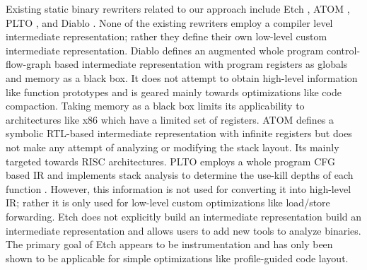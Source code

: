 Existing static binary rewriters related to our approach include Etch \cite{etch}, ATOM \cite{atom}, PLTO
\cite{plto}, and Diablo \cite{Diablo1}. None of the existing rewriters employ a compiler level intermediate
representation; rather they define their own low-level custom intermediate representation. Diablo
defines an augmented whole program control-flow-graph based intermediate representation with program
registers as globals and memory as a black box. It does not attempt to obtain high-level information
like function prototypes and is geared mainly towards optimizations like code compaction. Taking
memory as a black box limits its applicability to architectures like x86 which have a limited set of
registers. ATOM defines a symbolic RTL-based intermediate representation with infinite registers but
does not make any attempt of analyzing or modifying the stack layout. Its mainly targeted towards
RISC architectures. PLTO employs a whole program CFG based IR and implements stack analysis to
determine the use-kill depths of each function \cite{}. However, this information is not used for
converting it into high-level IR; rather it is only used for low-level custom optimizations like
load/store forwarding. Etch does not explicitly build an intermediate representation build an
intermediate representation and allows users to add new tools to analyze binaries. The primary goal
of Etch appears to be instrumentation and has only been shown to be applicable for simple
optimizations like profile-guided code layout.

